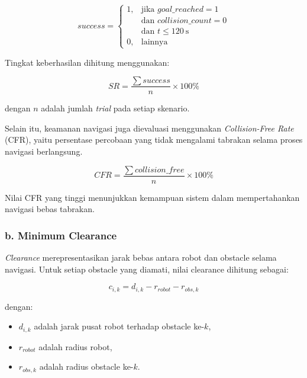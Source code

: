 \begin{equation}
success=
\begin{cases}
1, & \text{jika } goal\_reached = 1 \\
   & \text{dan } collision\_count = 0 \\
   & \text{dan } t \leq 120\ \text{s} \\
0, & \text{lainnya}
\end{cases}
\label{eq:success}
\end{equation}

Tingkat keberhasilan dihitung menggunakan:

\begin{equation}
SR=
\frac{\sum success}{n}\times100\%
\label{eq:success_rate}
\end{equation}

dengan $n$ adalah jumlah \textit{trial} pada setiap skenario.

Selain itu, keamanan navigasi juga dievaluasi menggunakan \textit{Collision-Free Rate} (CFR), yaitu persentase percobaan yang tidak mengalami tabrakan selama proses navigasi berlangsung.

\begin{equation}
CFR=
\frac{\sum collision\_free}{n}\times100\%
\label{eq:cfr}
\end{equation}

Nilai CFR yang tinggi menunjukkan kemampuan sistem dalam mempertahankan navigasi bebas tabrakan.

\subsubsection*{b. Minimum Clearance}

\textit{Clearance} merepresentasikan jarak bebas antara robot dan obstacle selama navigasi. Untuk setiap obstacle yang diamati, nilai clearance dihitung sebagai:

\begin{equation}
c_{i,k}
=
d_{i,k}
-
r_{robot}
-
r_{obs,k}
\label{eq:clearance}
\end{equation}

dengan:

\begin{itemize}
\item $d_{i,k}$ adalah jarak pusat robot terhadap obstacle ke-$k$,
\item $r_{robot}$ adalah radius robot,
\item $r_{obs,k}$ adalah radius obstacle ke-$k$.
\end{itemize}

